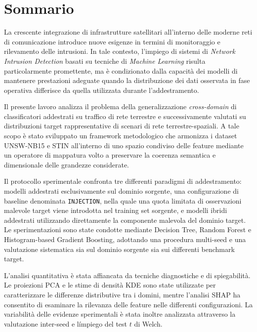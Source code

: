 \chapter*{Sommario}

La crescente integrazione di infrastrutture satellitari all'interno delle moderne reti di comunicazione introduce nuove esigenze in termini di monitoraggio e rilevamento delle intrusioni. 
In tale contesto, l'impiego di sistemi di \textit{Network Intrusion Detection} basati su tecniche di \textit{Machine Learning} risulta particolarmente promettente, ma è condizionato dalla capacità dei modelli di mantenere prestazioni adeguate quando la distribuzione dei dati osservata in fase operativa differisce da quella utilizzata durante l'addestramento.

Il presente lavoro analizza il problema della generalizzazione \textit{cross-domain} di classificatori addestrati su traffico di rete terrestre e successivamente valutati su distribuzioni target rappresentative di scenari di rete terrestre-spaziali.
A tale scopo è stato sviluppato un framework metodologico che armonizza i dataset UNSW-NB15 e STIN all'interno di uno spazio condiviso delle feature mediante un operatore di mappatura volto a preservare la coerenza semantica e dimensionale delle grandezze considerate.

Il protocollo sperimentale confronta tre differenti paradigmi di addestramento: modelli addestrati esclusivamente sul dominio sorgente, una configurazione di baseline denominata \texttt{INJECTION}, nella quale una quota limitata di osservazioni malevole target viene introdotta nel training set sorgente, e modelli ibridi addestrati utilizzando direttamente la componente malevola del dominio target. 
Le sperimentazioni sono state condotte mediante Decision Tree, Random Forest e Histogram-based Gradient Boosting, adottando una procedura multi-seed e una valutazione sistematica sia sul dominio sorgente sia sui differenti benchmark target.

L'analisi quantitativa è stata affiancata da tecniche diagnostiche e di spiegabilità. 
Le proiezioni PCA e le stime di densità KDE sono state utilizzate per caratterizzare le differenze distributive tra i domini, mentre l'analisi SHAP ha consentito di esaminare la rilevanza delle feature nelle differenti configurazioni. 
La variabilità delle evidenze sperimentali è stata inoltre analizzata attraverso la valutazione inter-seed e l\'impiego del test $t$ di Welch.

